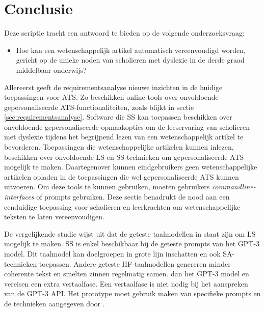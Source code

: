 
\chapter{Conclusie}%
\label{ch:conclusie}

Deze scriptie tracht een antwoord te bieden op de volgende onderzoeksvraag:

\begin{itemize}
	\item Hoe kan een wetenschappelijk artikel automatisch vereenvoudigd worden, gericht op de unieke noden van scholieren met dyslexie in de derde graad middelbaar onderwijs?
\end{itemize}

Allereerst geeft de requirementsanalyse nieuwe inzichten in de huidige toepassingen voor ATS. Zo beschikken online tools over onvoldoende gepersonaliseerde ATS-functionaliteiten, zoals blijkt in sectie \ref{sec:requirementsanalyse}. Software die SS kan toepassen beschikken over onvoldoende gepersonaliseerde opmaakopties om de leeservaring van scholieren met dyslexie tijdens het begrijpend lezen van een wetenschappelijk artikel te bevorderen. Toepassingen die wetenschappelijke artikelen kunnen inlezen, beschikken over onvoldoende LS en SS-technieken om gepersonaliseerde ATS mogelijk te maken. Daartegenover kunnen eindgebruikers geen wetenschappelijke artikelen opladen in de toepassingen die wel gepersonaliseerde ATS kunnen uitvoeren. Om deze tools te kunnen gebruiken, moeten gebruikers \textit{commandline-interfaces} of prompts gebruiken. Deze sectie benadrukt de nood aan een eenduidige toepassing voor scholieren en leerkrachten om wetenschappelijke teksten te laten vereenvoudigen.

\medspace

De vergelijkende studie wijst uit dat de geteste taalmodellen in staat zijn om LS mogelijk te maken. SS is enkel beschikbaar bij de geteste prompts van het GPT-3 model. Dit taalmodel kan doelgroepen in grote lijn inschatten en ook SA-technieken toepassen. Andere geteste HF-taalmodellen genereren minder coherente tekst en smelten zinnen regelmatig samen. dan het GPT-3 model en vereisen een extra vertaalfase. Een vertaalfase is niet nodig bij het aanspreken van de GPT-3 API. Het prototype moet gebruik maken van specifieke prompts en de technieken aangegeven door \textcite{McFarland2023, White2023}.

